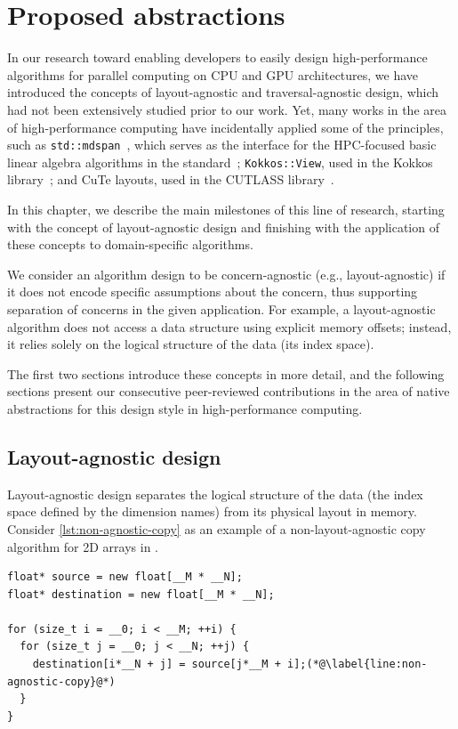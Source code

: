 \chapter{Proposed abstractions}\label{chap:abstractions}

In our research toward enabling developers to easily design high-performance algorithms for parallel computing on CPU and GPU architectures, we have introduced the concepts of layout-agnostic and traversal-agnostic design, which had not been extensively studied prior to our work. Yet, many works in the area of high-performance computing have incidentally applied some of the principles, such as \cpp \lstinline{std::mdspan}~\cite{trott2022mdspan}, which serves as the interface for the HPC-focused basic linear algebra algorithms in the \cpptwentysix standard~\cite{hoemmen2023linalg}; \lstinline{Kokkos::View}, used in the Kokkos library~\cite{trott2021kokkos}; and CuTe layouts, used in the CUTLASS library~\cite{thakkar2023cutlass}.

In this chapter, we describe the main milestones of this line of research, starting with the concept of layout-agnostic design and finishing with the application of these concepts to domain-specific algorithms.

We consider an algorithm design to be concern-agnostic (e.g., layout-agnostic) if it does not encode specific assumptions about the concern, thus supporting separation of concerns in the given application. For example, a layout-agnostic algorithm does not access a data structure using explicit memory offsets; instead, it relies solely on the logical structure of the data (its index space).

The first two sections introduce these concepts in more detail, and the following sections present our consecutive peer-reviewed contributions in the area of native abstractions for this design style in high-performance computing.


\section{Layout-agnostic design}\label{sec:layout-agnostic-design}

Layout-agnostic design separates the logical structure of the data (the index space defined by the dimension names) from its physical layout in memory. Consider \cref{lst:non-agnostic-copy} as an example of a non-layout-agnostic copy algorithm for 2D arrays in \cpp.

\begin{lstlisting}[style=C++, caption={A non-layout-agnostic copy algorithm in \cpp}, label={lst:non-agnostic-copy}]
float* source = new float[__M * __N];
float* destination = new float[__M * __N];

for (size_t i = __0; i < __M; ++i) {
  for (size_t j = __0; j < __N; ++j) {
    destination[i*__N + j] = source[j*__M + i];(*@\label{line:non-agnostic-copy}@*)
  }
}
\end{lstlisting}

